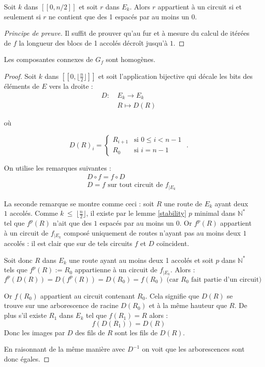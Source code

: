 \begin{lem}\label{stability}
Soit $k$ dans $[\![0, n/2]\!]$ et soit $r$ dans $E_k$. Alors $r$ appartient \`a un circuit si et seulement si $r$ ne contient que des 1 espac\'es par au moins un 0.
\end{lem}
\begin{proof}[Principe de preuve]
Il suffit de prouver qu'au fur et \`a mesure du calcul de it\'er\'ees de $f$ la longueur des blocs de 1 accol\'es d\'ecro\^it jusqu'\`a $1$.
\end{proof}

\begin{lem}\label{homog}
Les composantes connexes de $G_f$ sont homog\`enes.
\end{lem}
\begin{proof}
Soit $k$ dans $[\![0,\lfloor\frac{\scriptscriptstyle n}{\scriptscriptstyle 2}\rfloor]\!]$ et soit l'application bijective qui d\'ecale les bits des \'el\'ements de $E$ vers la droite :
\begin{align*}
D:\ &E_{k}\rightarrow E_{k}\\&R\mapsto D(R)
\end{align*}

o\`u

\[D(R)_{i}=\begin{cases}
R_{i+1} &\text{si }0\leq i<n-1\\
R_{0} &\text{si }i=n-1
\end{cases}\text{ .}\]\par

On utilise les remarques suivantes :
\begin{align*}
&D\circ f = f\circ D\\
&D = f \text{ sur tout circuit de }f_{|E_k}
\end{align*}

La seconde remarque se montre comme ceci : soit $R$ une route de $E_k$ ayant deux $1$ accol\'es. Comme $k\ \leq\ \lfloor\frac{\scriptscriptstyle n}{\scriptscriptstyle 2}\rfloor$, il existe par le lemme \ref{stability} $p$ minimal dans $\mathbb{N}^*$ tel que $f^{p}(R)$ n'ait que des $1$ espac\'es par au moins un $0$. Or $f^{p}(R)$ appartient \`a un circuit de $f_{|E_k}$ compos\'e uniquement de routes n'ayant pas au moins deux $1$ accol\'es : il est clair que sur de tels circuits $f$ et $D$ co\"incident.

Soit donc $R$  dans $E_k$ une route ayant au moins deux 1 accol\'es et soit $p$ dans $\mathbb{N}^*$ tels que $f^{p}(R):=R_0$ appartienne \`a un circuit de $f_{|E_{k}}$. Alors :
\[f^{p}(D(R))=D(f^{p}(R))=D(R_{0})=f(R_{0})\text{ (car }R_0\text{ fait partie d'un circuit)}\]

Or $f(R_{0})$ appartient au circuit contenant $R_0$. Cela signifie que $D(R)$ se trouve sur une arborescence de racine $D(R_{0})$ et \`a la m\^eme hauteur que $R$. De plus s'il existe $R_1$ dans $E_k$ tel que $f(R_{1})=R$ alors :
\[f(D(R_{1}))=D(R)\]
Donc les images par $D$ des \og fils \fg{} de $R$ sont les \og fils \fg{} de $D(R)$.\par
En raisonnant de la m\^eme mani\`ere avec $D^{-1}$ on voit que les arborescences sont donc \'egales.
\end{proof}

